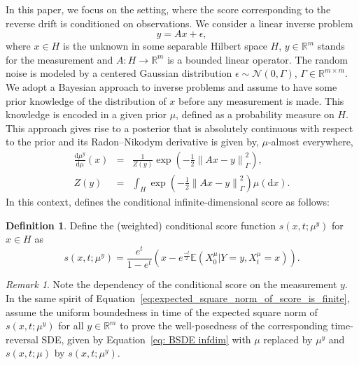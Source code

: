 \documentclass[10pt]{article} %
\def\Eqref#1{Equation~\ref{#1}}
\newcommand{\E}{\mathbb{E}}
\newcommand{\R}{\mathbb{R}}
\theoremstyle{plain}
\theoremstyle{definition}
\newtheorem{definition}[theorem]{Definition}
\theoremstyle{remark}
\newtheorem{remark}[theorem]{Remark}
\newcommand{\norm}[1]{\left\|#1\right\|}
\newcommand{\N}{\mathcal N}
\newcommand{\dd}{{\mathrm d}}
\begin{document}
In this paper, we focus on the setting, where the score corresponding to the reverse drift is conditioned on observations.
We consider a linear  inverse problem
\begin{equation}
	\label{eq:ip}
	y = Ax + \epsilon,
\end{equation}
where $x\in H$ is the unknown in some separable Hilbert space $H$, $y\in \R^m$ stands for the measurement and $A: H \rightarrow \R^m$ is a bounded linear operator. The random noise is modeled by a centered Gaussian distribution $\epsilon \sim \N(0, \Gamma)$, $\Gamma\in \R^{m\times m}$.
We adopt a Bayesian approach to inverse problems  \cite{stuart2010inverse} and assume to have some prior knowledge of the distribution of $x$ before any measurement is made. This knowledge is encoded in a given prior $\mu$, defined as a probability measure on $H$. 
This approach gives rise to a posterior that is absolutely continuous with respect to the prior and its Radon--Nikodym derivative is given by, $\mu$-almost everywhere, 
\begin{eqnarray}
\label{eq:posterior}
     \frac{\dd \mu^y}{\dd\mu}(x)  & = & \frac{1}{Z(y)} \exp\left(-\frac 12 \norm{Ax -y}_\Gamma^2\right), \\ 
     Z(y) & = & \int_H \exp\left(-\frac 12 \norm{Ax -y}_\Gamma^2\right) \mu(\dd x).
     \nonumber
\end{eqnarray}
In this context, \citet{baldassari2024conditional} defines the conditional infinite-dimensional score as follows:
\begin{definition}\label{def:conditional_score_infiniteD}
    Define the (weighted) conditional score function $s(x,t; \mu^y)$ for $x \in H$ as
\begin{equation*}
       s(x, t; \mu^y) = \frac{e^t}{1-e^{t}}\left(x - e^{\frac{-t}{2}}\E(X^{\mu}_0 | Y = y, X^{\mu}_t = x)\right).
\end{equation*}
\end{definition}

\begin{remark} \label{rm:cond_score}
Note the dependency of the conditional score on the measurement $y$. In the same spirit of \Eqref{eq:expected_square_norm_of_score_is_finite}, \citet{baldassari2024conditional} assume the uniform boundedness in time of the expected square norm of $s(x,t;\mu^y)$ for all $y\in\R^m$ to prove the well-posedness of the corresponding time-reversal SDE, given by \Eqref{eq: BSDE infdim} with $\mu $ replaced by $ \mu^y$ and $s(x,t;\mu)$ by $s(x,t;\mu^y)$.  %
\end{remark}
\end{document}
